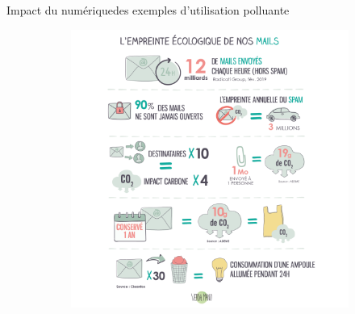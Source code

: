 \documentclass[10pt,xcolor={dvipsnames}]{beamer}
\begin{document}
\begin{frame}{Impact du numérique}{des exemples d'utilisation polluante}

\begin{figure}[h!]

\begin{minipage}[b]{0.6\linewidth}
    \begin{figure}
        \centering
        \includegraphics[scale=0.2]{Feathergraphics/mail.png}
    \end{figure}
\end{minipage}\hfill
\begin{minipage}[b]{0.3\linewidth}  
\begin{figure}
    \centering

\end{figure}
\end{minipage}
\end{figure}
\end{frame}
\end{document}
